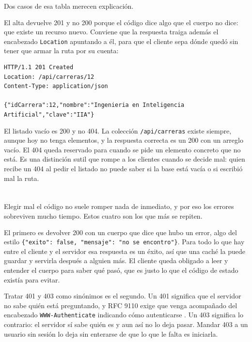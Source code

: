 \documentclass[10pt,a4paper]{article}
\begin{document}
Dos casos de esa tabla merecen explicación.

El alta devuelve 201 y no 200 porque el código dice algo que el cuerpo no dice: que existe un recurso nuevo. Conviene que la respuesta traiga además el encabezado \texttt{Location} apuntando a él, para que el cliente sepa dónde quedó sin tener que armar la ruta por su cuenta:

\begin{lstlisting}[caption={Respuesta al alta de una carrera}]
HTTP/1.1 201 Created
Location: /api/carreras/12
Content-Type: application/json

{"idCarrera":12,"nombre":"Ingenieria en Inteligencia Artificial","clave":"IIA"}
\end{lstlisting}

El listado vacío es 200 y no 404. La colección \texttt{/api/carreras} existe siempre, aunque hoy no tenga elementos, y la respuesta correcta es un 200 con un arreglo vacío. El 404 queda reservado para cuando se pide un elemento concreto que no está. Es una distinción sutil que rompe a los clientes cuando se decide mal: quien recibe un 404 al pedir el listado no puede saber si la base está vacía o si escribió mal la ruta.

\section{\color{colorIPN}{Los errores de elección más frecuentes}}

Elegir mal el código no suele romper nada de inmediato, y por eso los errores sobreviven mucho tiempo. Estos cuatro son los que más se repiten.

El primero es devolver 200 con un cuerpo que dice que hubo un error, algo del estilo \texttt{\{"exito": false, "mensaje": "no se encontro"\}}. Para todo lo que hay entre el cliente y el servidor esa respuesta es un éxito, así que una caché la puede guardar y servirla después a alguien más. El cliente queda obligado a leer y entender el cuerpo para saber qué pasó, que es justo lo que el código de estado existía para evitar.

Tratar 401 y 403 como sinónimos es el segundo. Un 401 significa que el servidor no sabe quién está preguntando, y RFC 9110 exige que venga acompañado del encabezado \texttt{WWW-Authenticate} indicando cómo autenticarse \cite{rfc9110}. Un 403 significa lo contrario: el servidor sí sabe quién es y aun así no lo deja pasar. Mandar 403 a un usuario sin sesión lo deja sin enterarse de que lo que le falta es iniciarla.
\end{document}
